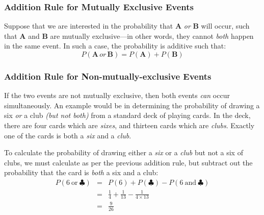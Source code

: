 \documentclass[12pt]{article}
\begin{document}
\subsubsection{Addition Rule for Mutually Exclusive Events}
Suppose that we are interested in the probability that \textbf{A} \textit{or} \textbf{B} will occur, such that \textbf{A} and \textbf{B} are mutually exclusive---in other words, they cannot \textit{both} happen in the same event. In such a case, the probability is additive such that:
\begin{equation}
P(\textbf{A} \, or\, \textbf{B}) = P(\textbf{A}) + P(\textbf{B})
\end{equation}

\subsubsection{Addition Rule for Non-mutually-exclusive Events}
If the two events are not mutually exclusive, then both events \textit{can} occur simultaneously. An example would be in determining the probability of drawing a six \textit{or} a club \textit{(but not both)} from a standard deck of playing cards. In the deck, there are four cards which are \textit{sixes}, and thirteen cards which are \textit{clubs}. Exactly one of the cards is both a \textit{six} and a \textit{club}.

To calculate the probability of drawing either a \textit{six} or a \textit{club} but not a six of clubs, we must calculate as per the previous addition rule, but subtract out the probability that the card is \textit{both} a six and a club:
\begin{eqnarray}
P(6 \: \textrm{or} \: \clubsuit) & = & P(6) + P(\clubsuit) - P(6 \: \textrm{and} \: \clubsuit)  \\
& = & \frac{1}{4} + \frac{1}{13} - \frac{1}{4 \times 13} \nonumber \\
& = & \frac{9}{26} \nonumber
\end{eqnarray}
\end{document}
